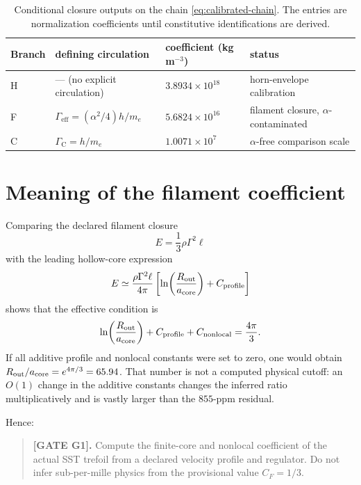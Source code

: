 \documentclass[aps,pre,preprint,notitlepage,nofootinbib,superscriptaddress]{revtex4-2}
\newcommand{\Gammaeff}{\Gamma_{\mathrm{eff}}}
\newcommand{\GammaC}{\Gamma_{\mathrm C}}
\begin{document}
\begin{table}[t]
\caption{Conditional closure outputs on the chain \cref{eq:calibrated-chain}.  The entries are normalization coefficients until constitutive identifications are derived.}
\label{tab:closures}
\begin{ruledtabular}
\begin{tabular}{llll}
Branch & defining circulation & coefficient (kg\,m\(^{-3}\)) & status\\
\hline
H & --- (no explicit circulation) & \(3.8934\times10^{18}\) & horn-envelope calibration\\
F & \(\Gammaeff=(\alpha^2/4)h/m_e\) & \(5.6824\times10^{16}\) & filament closure, \(\alpha\)-contaminated\\
C & \(\GammaC=h/m_e\) & \(1.0071\times10^{7}\) & \(\alpha\)-free comparison scale\\
\end{tabular}
\end{ruledtabular}
\end{table}

\section{Meaning of the filament coefficient}
\label{sec:line-coefficient}

Comparing the declared filament closure
\[
E=\frac13\rho\Gamma^2\ell
\]
with the leading hollow-core expression
\[
E
\simeq
\frac{\rho\Gamma^2\ell}{4\pi}
\left[
\ln\!\left(\frac{R_{\rm out}}{a_{\rm core}}\right)
+C_{\rm profile}
\right]
\]
shows that the effective condition is
\begin{equation}
  \ln\!\left(\frac{R_{\rm out}}{a_{\rm core}}\right)
  +C_{\rm profile}
  +C_{\rm nonlocal}
  =
  \frac{4\pi}{3}.
  \label{eq:effective-log}
\end{equation}
If all additive profile and nonlocal constants were set to zero, one would obtain \(R_{\rm out}/a_{\rm core}=e^{4\pi/3}=65.94\).  That number is not a computed physical cutoff: an \(O(1)\) change in the additive constants changes the inferred ratio multiplicatively and is vastly larger than the \(855\)-ppm residual.

Hence:

\begin{quote}
\textbf{[GATE G1].}
Compute the finite-core and nonlocal coefficient of the actual SST trefoil from a declared velocity profile and regulator.  Do not infer sub-per-mille physics from the provisional value \(C_F=1/3\).
\end{quote}
\end{document}
